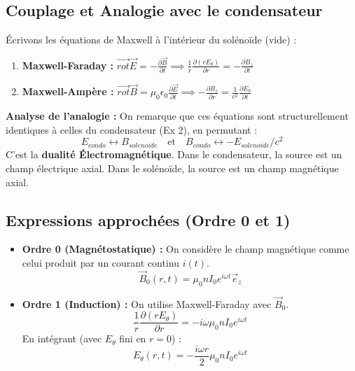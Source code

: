 \documentclass[french]{yLectureNote}
\renewcommand{\vec}{\overrightarrow}
\begin{document}
\subsection{Couplage et Analogie avec le condensateur}

Écrivons les équations de Maxwell à l'intérieur du solénoïde (vide) :
\begin{enumerate}
    \item \textbf{Maxwell-Faraday :} $\vec{rot} \vec{E} = -\frac{\partial \vec{B}}{\partial t} \implies \frac{1}{r} \frac{\partial (r E_\theta)}{\partial r} = -\frac{\partial B_z}{\partial t}$
    \item \textbf{Maxwell-Ampère :} $\vec{rot} \vec{B} = \mu_0 \epsilon_0 \frac{\partial \vec{E}}{\partial t} \implies -\frac{\partial B_z}{\partial r} = \frac{1}{c^2} \frac{\partial E_\theta}{\partial t}$
\end{enumerate}


\textbf{Analyse de l'analogie :}
On remarque que ces équations sont structurellement identiques à celles du condensateur (Ex 2), en permutant :
\[ E_{condo} \longleftrightarrow B_{solenoide} \quad \text{et} \quad B_{condo} \longleftrightarrow -E_{solenoide}/c^2 \]
C'est la \textbf{dualité Électromagnétique}. Dans le condensateur, la source est un champ électrique axial. Dans le solénoïde, la source est un champ magnétique axial.

\subsection{Expressions approchées (Ordre 0 et 1)}

\begin{itemize}
    \item \textbf{Ordre 0 (Magnétostatique) :} On considère le champ magnétique comme celui produit par un courant continu $i(t)$.
    \[ \vec{B}_0(r,t) = \mu_0 n I_0 e^{i\omega t} \vec{e}_z \]
    \item \textbf{Ordre 1 (Induction) :} On utilise Maxwell-Faraday avec $\vec{B}_0$.
    \[ \frac{1}{r} \frac{\partial (r E_\theta)}{\partial r} = -i\omega \mu_0 n I_0 e^{i\omega t} \]
    En intégrant (avec $E_\theta$ fini en $r=0$) :
    \[ E_\theta(r,t) = -\frac{i\omega r}{2} \mu_0 n I_0 e^{i\omega t} \]
\end{itemize}
\end{document}
